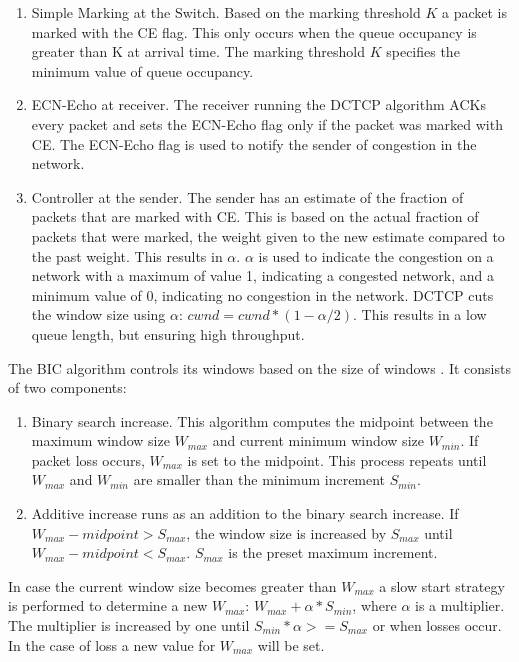 \documentclass{article}
\begin{document}
\begin{enumerate}
	\item Simple Marking at the Switch. Based on the marking threshold $K$ a packet is marked with the CE flag. This only occurs when the queue occupancy is greater than K at arrival time. The marking threshold $K$ specifies the minimum value of queue occupancy.
	\item ECN-Echo at receiver. The receiver running the DCTCP algorithm ACKs every packet and sets the ECN-Echo flag only if the packet was marked with CE. The ECN-Echo flag is used to notify the sender of congestion in the network.
	\item Controller at the sender. The sender has an estimate of the fraction of packets that are marked with CE. This is based on the actual fraction of packets that were marked, the weight given to the new estimate compared to the past weight. This results in $\alpha$. $\alpha$ is used to indicate the congestion on a network with a maximum of value 1, indicating a congested network, and a minimum value of 0, indicating no congestion in the network. DCTCP cuts the window size using $\alpha$: $cwnd = cwnd * (1 - \alpha/2)$. This results in a low queue length, but ensuring high throughput.\\
\end{enumerate}

The BIC algorithm controls its windows based on the size of windows \cite{bic-tcp-congestion}. It consists of two components:

\begin{enumerate}
	\item Binary search increase. This algorithm computes the midpoint between the maximum window size $W_{max}$ and current minimum window size $W_{min}$. If packet loss occurs, $W_{max}$ is set to the midpoint. This process repeats until $W_{max}$ and $W_{min}$ are smaller than the minimum increment $S_{min}$.
	\item Additive increase runs as an addition to the binary search increase. If $W_{max} - midpoint > S_{max}$, the window size is increased by $S_{max}$ until $W_{max} - midpoint < S_{max}$. $S_{max}$ is the preset maximum increment.
\end{enumerate}
In case the current window size becomes greater than $W_{max}$ a slow start strategy is performed to determine a new $W_{max}$: $W_{max} + \alpha * S_{min}$, where $\alpha$ is a multiplier. The multiplier is increased by one until $S_{min} * \alpha >= S_{max}$ or when losses occur. In the case of loss a new value for $W_{max}$ will be set.
\end{document}

